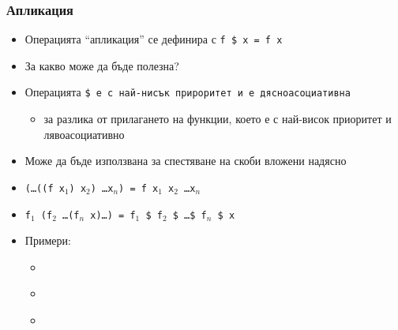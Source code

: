 \documentclass{beamer}
\begin{document}
\begin{frame}
  \frametitle{Апликация}
  \begin{itemize}[<+->]
  \item Операцията ``апликация'' се дефинира с \tt{f \$ x = f x}
  \item За какво може да бъде полезна?
  \item Операцията \tt{\$} е с най-нисък прироритет и е дясноасоциативна
    \begin{itemize}
    \item за разлика от прилагането на функции, което е с най-висок приоритет и лявоасоциативно
    \end{itemize}
  \item Може да бъде използвана за спестяване на скоби вложени надясно
  \item \tt{(\ldots((f x$_1$) x$_2$) \ldots x$_n$)} = \tt{f x$_1$ x$_2$ \ldots x$_n$}
  \item \tt{f$_1$ (f$_2$ \ldots (f$_n$ x)\ldots)} = \tt{f$_1$ \$ f$_2$ \$ \ldots \$ f$_n$ \$ x}
  \item Примери:
    \begin{itemize}
    \item \tt{}
    \item \tt{}
    \item {}
    \end{itemize}
  \end{itemize}
\end{frame}
\end{document}
